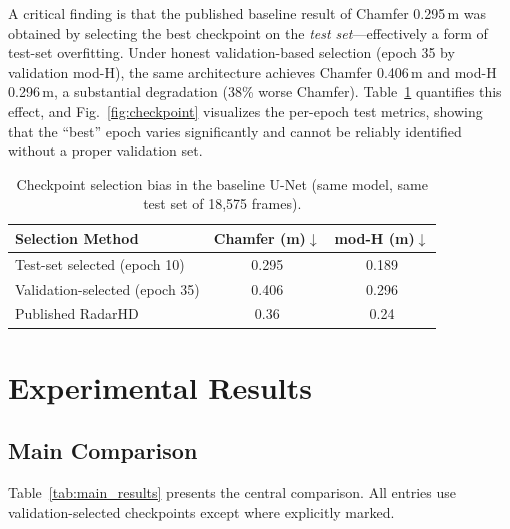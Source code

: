 \documentclass[conference]{IEEEtran}
\begin{document}
A critical finding is that the published baseline result of Chamfer 0.295\,m was obtained by selecting the best checkpoint on the \emph{test set}---effectively a form of test-set overfitting.
Under honest validation-based selection (epoch 35 by validation mod-H), the same architecture achieves Chamfer 0.406\,m and mod-H 0.296\,m, a substantial degradation (38\% worse Chamfer).
Table~\ref{tab:selection_bias} quantifies this effect, and Fig.~\ref{fig:checkpoint} visualizes the per-epoch test metrics, showing that the ``best'' epoch varies significantly and cannot be reliably identified without a proper validation set.

\begin{table}[t]
\centering
\caption{Checkpoint selection bias in the baseline U-Net (same model, same test set of 18,575 frames).}
\label{tab:selection_bias}
\footnotesize
\begin{tabular}{lcc}
\toprule
Selection Method & Chamfer (m)$\downarrow$ & mod-H (m)$\downarrow$ \\
\midrule
Test-set selected (epoch 10) & 0.295 & 0.189 \\
Validation-selected (epoch 35) & 0.406 & 0.296 \\
Published RadarHD~\cite{prabhakara2023radarhd} & 0.36 & 0.24 \\
\bottomrule
\end{tabular}
\end{table}

\section{Experimental Results}

\subsection{Main Comparison}

Table~\ref{tab:main_results} presents the central comparison.
All entries use validation-selected checkpoints except where explicitly marked.
\end{document}
